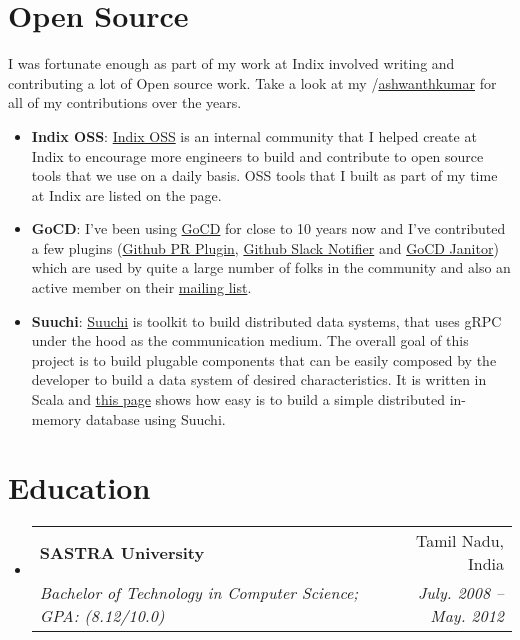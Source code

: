 \documentclass[letterpaper,11pt]{article}
\makeatletter
\newcommand{\resumeItem}[2]{
  \item\small{
    \textbf{#1}{: #2 \vspace{-2pt}}
  }
}
\newcommand{\resumeSubheading}[4]{
  \vspace{-1pt}\item
    \begin{tabular*}{0.97\textwidth}[t]{l@{\extracolsep{\fill}}r}
      \textbf{#1} & #2 \\
      \textit{\small#3} & \textit{\small #4} \\
    \end{tabular*}\vspace{-5pt}
}
\newcommand{\sectionIntro}[1]{\parbox{\textwidth}{#1}}
\newcommand{\resumeSubHeadingListStart}{\begin{itemize}[leftmargin=*]}
\newcommand{\resumeSubHeadingListEnd}{\end{itemize}}
\newcommand{\resumeItemListStart}{\begin{itemize}}
\newcommand{\resumeItemListEnd}{\end{itemize}\vspace{-5pt}}
\makeatother
\begin{document}
\section{Open Source}
  \sectionIntro
  {
    I was fortunate enough as part of my work at Indix involved writing and contributing a lot of Open source work. Take a look at my \faIcon{github}/\href{https://github.com/ashwanthkumar}{ashwanthkumar} for all of my contributions over the years.
  }
  \resumeItemListStart
    \resumeItem{Indix OSS}{
      \href{https://oss.indix.com/}{Indix OSS} is an internal community that I helped create at Indix to encourage more engineers to build and contribute to open source tools that we use on a daily basis. OSS tools that I built as part of my time at Indix are listed on the page.
    }
  \resumeItem{GoCD}{
      I've been using \href{https://www.gocd.org/}{GoCD} for close to 10 years now and I've contributed a few plugins (\href{https://github.com/ashwanthkumar/gocd-build-github-pull-requests}{Github PR Plugin}, \href{https://github.com/ashwanthkumar/gocd-slack-build-notifier}{Github Slack Notifier} and \href{https://github.com/ashwanthkumar/gocd-janitor}{GoCD Janitor}) which are used by quite a large number of folks in the community and also an active member on their \href{https://groups.google.com/g/go-cd/search?q=ashwanth\%20kumar}{mailing list}.
  }
  \resumeItem{Suuchi}{
    \href{https://github.com/ashwanthkumar/suuchi}{Suuchi} is toolkit to build distributed data systems, that uses gRPC under the hood as the communication medium. The overall goal of this project is to build plugable components that can be easily composed by the developer to build a data system of desired characteristics. It is written in Scala and \href{https://ashwanthkumar.github.io/suuchi/recipes/inmemorydb/}{this page} shows how easy is to build a simple distributed in-memory database using Suuchi.
  }
  \resumeItemListEnd

\section{Education}
  \resumeSubHeadingListStart
    \resumeSubheading
      {SASTRA University}{Tamil Nadu, India}
      {Bachelor of Technology in Computer Science;  GPA: (8.12/10.0)}{July. 2008 -- May. 2012}
  \resumeSubHeadingListEnd

\end{document}
